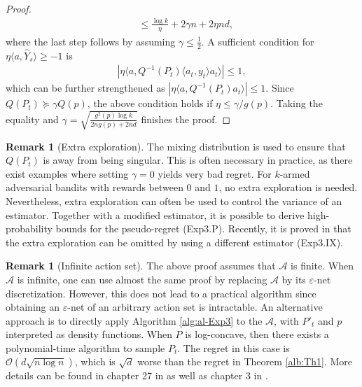 \documentclass[letterpaper,11pt,openright,openany]{book}
\numberwithin{equation}{section}
\theoremstyle{plain}
\theoremstyle{definition}
\newtheorem{Rem}[Th]{Remark}
\def\e{{\varepsilon}}
\begin{document}
\begin{proof}
\begin{align*}
&\leq \frac{\log k}{\eta}+2\gamma n+2\eta nd,
\end{align*}
where the last step follows by assuming $\gamma\leq\frac{1}{2}$. A sufficient condition for $\eta\langle a, \hat{Y}_s\rangle\geq -1$ is
\begin{align*}
\left|\eta\langle a, Q^{-1}(P_t)\langle a_t, y_t\rangle a_t\rangle\right|\leq 1,
\end{align*}
which can be further strengthened as $\left|\eta\langle a, Q^{-1}(P_t)a_t\rangle\right|\leq 1$. Since $Q(P_t)\succcurlyeq \gamma Q(p)$, the above condition holds if $\eta\leq \gamma/g(p)$. Taking the equality and $\gamma=\sqrt{\frac{g^2(p)\log k}{2ng(p)+2nd}}$ finishes the proof.   
\end{proof}

\begin{Rem}[Extra exploration]
The mixing distribution is used to ensure that $Q(P_t)$ is away from being singular. 
This is often necessary in practice, as there exist examples where setting $\gamma = 0$ yields very bad regret. For $k$-armed adversarial bandits with rewards between $0$ and $1$, no extra exploration is needed. 
Nevertheless, extra exploration can often be used to control the variance of an estimator. 
Together with a modified estimator, it is possible to derive high-probability bounds for the pseudo-regret \cite{Auer_2002} (Exp3.P). 
Recently, it is proved in \cite{kocak2014efficient} that the extra exploration can be omitted by using a different estimator \cite{kocak2014efficient} (Exp3.IX). 
\end{Rem}

\begin{Rem}[Infinite action set]
The above proof assumes that $\mathcal A$ is finite. When $\mathcal A$ is infinite, one can use almost the same proof by replacing $\mathcal A$ by its $\e$-net discretization. However, this does not lead to a practical algorithm since obtaining an $\e$-net of an arbitrary action set is intractable. An alternative approach is to directly apply Algorithm \ref{alg:al-Exp3} to the $\mathcal A$, with $P'_t$ and $p$ interpreted as density functions. When $P$ is log-concave, then there exists a polynomial-time algorithm to sample $P_t$. The regret in this case is $\mathcal O(d\sqrt{n\log n})$, which is $\sqrt{d}$ worse than the regret in Theorem \ref{alb:Th1}. More details can be found in chapter 27 in \cite{lattimore2018bandit} as well as chapter 3 in \cite{bubeck2011introduction}. 
\end{Rem}
\end{document}
